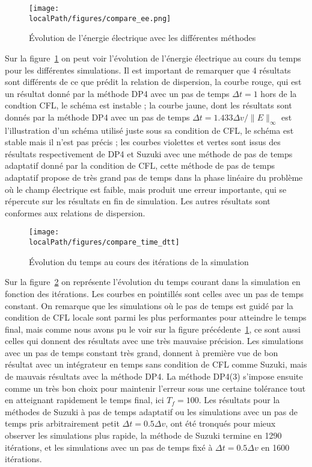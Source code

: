 \begin{figure}[h]
  \centering
  \texttt{[image: \\localPath/figures/compare\_ee.png]}
  \caption{Évolution de l'énergie électrique avec les différentes méthodes}
  \label{fig:compare:ee}
\end{figure}

Sur la figure~\ref{fig:compare:ee} on peut voir l'évolution de l'énergie électrique au cours du temps pour les différentes simulations. Il est important de remarquer que 4 résultats sont différents de ce que prédit la relation de dispersion, la courbe rouge, qui est un résultat donné par la méthode DP4 avec un pas de temps $\Delta t=1$ hors de la condtion CFL, le schéma est instable ; la courbe jaune, dont les résultats sont donnés par la méthode DP4 avec un pas de temps $\Delta t=1.433\Delta v/\|E\|_\infty$ est l'illustration d'un schéma utilisé juste sous sa condition de CFL, le schéma est stable mais il n'est pas précis ; les courbes violettes et vertes sont issus des résultats respectivement de DP4 et Suzuki avec une méthode de pas de temps adaptatif donné par la condition de CFL, cette méthode de pas de temps adaptatif propose de très grand pas de temps dans la phase linéaire du problème où le champ électrique est faible, mais produit une erreur importante, qui se répercute sur les résultats en fin de simulation. Les autres résultats sont conformes aux relations de dispersion. 

\begin{figure}[h]
  \centering
  \texttt{[image: \\localPath/figures/compare\_time\_dtt]}
  \caption{Évolution du temps au cours des itérations de la simulation}
  \label{fig:compare:time:dtt}
\end{figure}

Sur la figure~\ref{fig:compare:time:dtt} on représente l'évolution du temps courant dans la simulation en fonction des itérations. Les courbes en pointillés sont celles avec un pas de temps constant. On remarque que les simulations où le pas de temps est guidé par la condition de CFL locale sont parmi les plus performantes pour atteindre le temps final, mais comme nous avons pu le voir sur la figure précédente~\ref{fig:compare:ee}, ce sont aussi celles qui donnent des résultats avec une très mauvaise précision. Les simulations avec un pas de temps constant très grand, donnent à première vue de bon résultat avec un intégrateur en temps sans condition de CFL comme Suzuki, mais de mauvais résultats avec la méthode DP4. La méthode DP4(3) s'impose ensuite comme un très bon choix pour maintenir l'erreur sous une certaine tolérance tout en atteignant rapidement le temps final, ici $T_f=100$. Les résultats pour la méthodes de Suzuki à pas de temps adaptatif ou les simulations avec un pas de temps pris arbitrairement petit $\Delta t = 0.5\Delta v$, ont été tronqués pour mieux observer les simulations plus rapide, la méthode de Suzuki termine en 1290 itérations, et les simulations avec un pas de temps fixé à $\Delta t = 0.5\Delta v$ en 1600 itérations.

